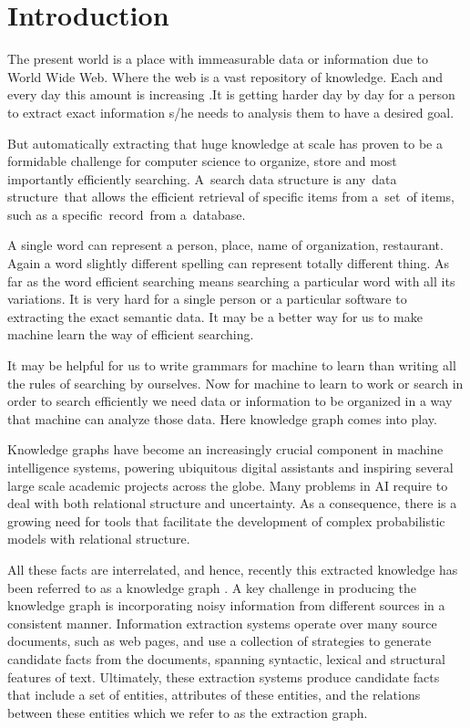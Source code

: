 \chapter{Introduction}\label{intro}
The present world is a place with immeasurable data or information due to World Wide Web.
 Where the web is a vast repository of knowledge. 
 Each and every day this amount is increasing .It is getting harder day by day 
 for a person to extract exact information s/he needs to analysis them to have a desired goal.



 But automatically extracting that huge knowledge at scale has proven to be a formidable challenge for computer science to organize, store and most importantly efficiently searching. A search data structure is any data structure that allows the efficient retrieval of specific items from a set of items, 
 such as a specific record from a database.


 A single word can represent a person, place, name of organization, restaurant. Again a word slightly different spelling can represent totally different thing. As far as the word efficient searching means searching a particular word with all its variations. It is very hard for a single person or a particular software to extracting the exact semantic data. It may be a better way for us to make machine learn the way of efficient searching.


 It may be helpful for us to write grammars for machine to learn than writing all the rules of searching by ourselves. Now for machine to learn to work or search in order to search efficiently we need data or information to be organized in a way that machine can analyze those data. Here knowledge graph comes into play.


 Knowledge graphs have become an increasingly crucial component in machine intelligence systems, powering ubiquitous digital assistants and inspiring several large scale academic projects across the globe. Many problems in AI require to deal with both relational structure and uncertainty. As a consequence, there is a growing need for tools that facilitate the development of complex probabilistic models with relational structure.



 All these facts are interrelated, and hence, recently this extracted knowledge has been referred to as a knowledge graph . A key challenge in producing the knowledge graph is incorporating noisy information from different sources in a consistent manner. Information extraction systems operate over many source documents, such as web pages, and use a collection of strategies to generate candidate facts from the documents, spanning syntactic, lexical and structural features of text. Ultimately, these extraction systems produce candidate facts that include a set of entities, attributes of these entities, and the relations between these entities which we refer to as the extraction graph.


